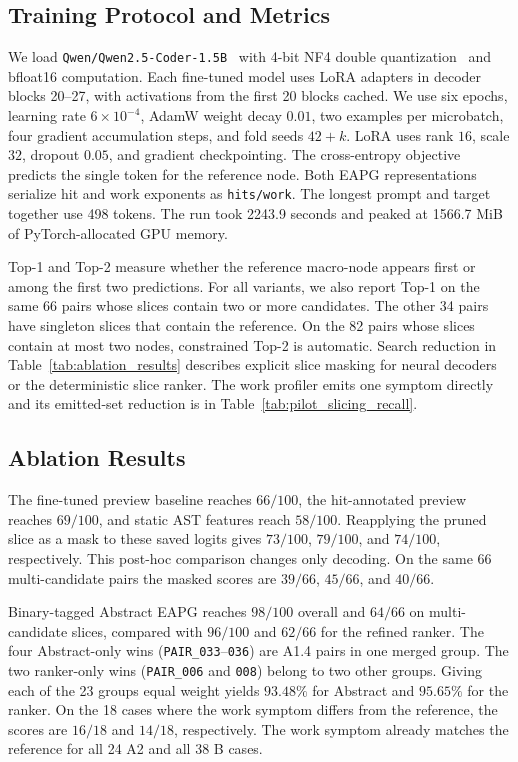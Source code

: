 \documentclass[10pt,conference]{IEEEtran}
\begin{document}
\subsection{Training Protocol and Metrics}
We load \texttt{Qwen/Qwen2.5-Coder-1.5B}~\cite{hui2024qwen25coder} with 4-bit NF4 double quantization~\cite{dettmers2023qlora} and bfloat16 computation. Each fine-tuned model uses LoRA adapters in decoder blocks 20--27, with activations from the first 20 blocks cached. We use six epochs, learning rate $6\times 10^{-4}$, AdamW weight decay $0.01$, two examples per microbatch, four gradient accumulation steps, and fold seeds $42+k$. LoRA uses rank $16$, scale $32$, dropout $0.05$, and gradient checkpointing. The cross-entropy objective predicts the single token for the reference node. Both EAPG representations serialize hit and work exponents as \texttt{hits/work}. The longest prompt and target together use 498 tokens. The run took 2243.9 seconds and peaked at 1566.7 MiB of PyTorch-allocated GPU memory.

Top-1 and Top-2 measure whether the reference macro-node appears first or among the first two predictions. For all variants, we also report Top-1 on the same 66 pairs whose slices contain two or more candidates. The other 34 pairs have singleton slices that contain the reference. On the 82 pairs whose slices contain at most two nodes, constrained Top-2 is automatic. Search reduction in Table~\ref{tab:ablation_results} describes explicit slice masking for neural decoders or the deterministic slice ranker. The work profiler emits one symptom directly and its emitted-set reduction is in Table~\ref{tab:pilot_slicing_recall}.



\subsection{Ablation Results}
The fine-tuned preview baseline reaches $66/100$, the hit-annotated preview reaches $69/100$, and static AST features reach $58/100$. Reapplying the pruned slice as a mask to these saved logits gives $73/100$, $79/100$, and $74/100$, respectively. This post-hoc comparison changes only decoding. On the same 66 multi-candidate pairs the masked scores are $39/66$, $45/66$, and $40/66$.

Binary-tagged Abstract EAPG reaches $98/100$ overall and $64/66$ on multi-candidate slices, compared with $96/100$ and $62/66$ for the refined ranker. The four Abstract-only wins (\texttt{PAIR\_033}--\texttt{036}) are A1.4 pairs in one merged group. The two ranker-only wins (\texttt{PAIR\_006} and \texttt{008}) belong to two other groups. Giving each of the 23 groups equal weight yields $93.48\%$ for Abstract and $95.65\%$ for the ranker. On the 18 cases where the work symptom differs from the reference, the scores are $16/18$ and $14/18$, respectively. The work symptom already matches the reference for all 24 A2 and all 38 B cases.
\end{document}
